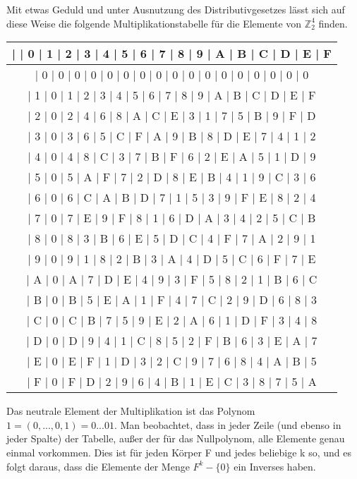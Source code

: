 \documentclass[a4paper]{article}
\begin{document}
\begin{multicols}{3}
    Mit etwas Geduld und unter Ausnutzung des Distributivgesetzes lässt sich auf diese Weise die folgende Multiplikationstabelle für die Elemente von $\mathbb{Z}^4_2$ finden.
    \begin{tabular}{c}
        |   | 0  | 1  | 2  | 3  | 4  | 5  | 6  | 7  | 8  | 9  | A  | B  | C  | D  | E  | F  \\\hline
        | 0  | 0  | 0  | 0  | 0  | 0  | 0  | 0  | 0  | 0  | 0  | 0  | 0  | 0  | 0  | 0  | 0 \\
        | 1  | 0  | 1  | 2  | 3  | 4  | 5  | 6  | 7  | 8  | 9  | A  | B  | C  | D  | E  | F \\
        | 2  | 0  | 2  | 4  | 6  | 8  | A  | C  | E  | 3  | 1  | 7  | 5  | B  | 9  | F  | D \\
        | 3  | 0  | 3  | 6  | 5  | C  | F  | A  | 9  | B  | 8  | D  | E  | 7  | 4  | 1  | 2 \\
        | 4  | 0  | 4  | 8  | C  | 3  | 7  | B  | F  | 6  | 2  | E  | A  | 5  | 1  | D  | 9 \\
        | 5  | 0  | 5  | A  | F  | 7  | 2  | D  | 8  | E  | B  | 4  | 1  | 9  | C  | 3  | 6 \\
        | 6  | 0  | 6  | C  | A  | B  | D  | 7  | 1  | 5  | 3  | 9  | F  | E  | 8  | 2  | 4 \\
        | 7  | 0  | 7  | E  | 9  | F  | 8  | 1  | 6  | D  | A  | 3  | 4  | 2  | 5  | C  | B \\
        | 8  | 0  | 8  | 3  | B  | 6  | E  | 5  | D  | C  | 4  | F  | 7  | A  | 2  | 9  | 1 \\
        | 9  | 0  | 9  | 1  | 8  | 2  | B  | 3  | A  | 4  | D  | 5  | C  | 6  | F  | 7  | E \\
        | A  | 0  | A  | 7  | D  | E  | 4  | 9  | 3  | F  | 5  | 8  | 2  | 1  | B  | 6  | C \\
        | B  | 0  | B  | 5  | E  | A  | 1  | F  | 4  | 7  | C  | 2  | 9  | D  | 6  | 8  | 3 \\
        | C  | 0  | C  | B  | 7  | 5  | 9  | E  | 2  | A  | 6  | 1  | D  | F  | 3  | 4  | 8 \\
        | D  | 0  | D  | 9  | 4  | 1  | C  | 8  | 5  | 2  | F  | B  | 6  | 3  | E  | A  | 7 \\
        | E  | 0  | E  | F  | 1  | D  | 3  | 2  | C  | 9  | 7  | 6  | 8  | 4  | A  | B  | 5 \\
        | F  | 0  | F  | D  | 2  | 9  | 6  | 4  | B  | 1  | E  | C  | 3  | 8  | 7  | 5  | A
    \end{tabular}

    Das neutrale Element der Multiplikation ist das Polynom $1=(0,..., 0 ,1) = 0... 01$. Man beobachtet, dass in jeder Zeile (und ebenso in jeder Spalte) der Tabelle, außer der für das Nullpolynom, alle Elemente genau einmal vorkommen. Dies ist für jeden Körper F und jedes beliebige k so, und es folgt daraus, dass die Elemente der Menge $F^k-\{0\}$ ein Inverses haben.


\end{multicols}
\end{document}
